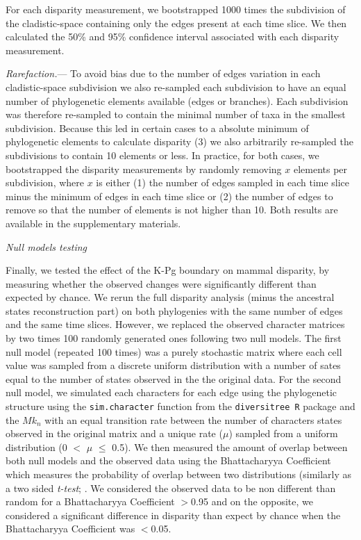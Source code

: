 \documentclass[12pt,letterpaper]{article}
\renewcommand{\subsection}[1]{%
\bigskip
\begin{center}
\begin{large}
\normalfont\itshape #1
\end{large}
\end{center}}
\renewcommand{\subsubsection}[1]{%
\vspace{2ex}
\noindent
\textit{#1.}---}
\begin{document}
For each disparity measurement, we bootstrapped 1000 times the subdivision of the cladistic-space containing only the edges present at each time slice. We then calculated the 50\% and 95\% confidence interval associated with each disparity measurement.

\subsubsection{Rarefaction}
To avoid bias due to the number of edges variation in each cladistic-space subdivision we also re-sampled each subdivision to have an equal number of phylogenetic elements available (edges or branches). Each subdivision was therefore re-sampled to contain the minimal number of taxa in the smallest subdivision. Because this led in certain cases to a absolute minimum of phylogenetic elements to calculate disparity (3) we also arbitrarily re-sampled the subdivisions to contain 10 elements or less. In practice, for both cases, we bootstrapped the disparity measurements by randomly removing $x$ elements per subdivision, where $x$ is either (1) the number of edges sampled in each time slice minus the minimum of edges in each time slice or (2) the number of edges to remove so that the number of elements is not higher than 10. Both results are available in the supplementary materials.

\subsection{Null models testing}
Finally, we tested the effect of the K-Pg boundary on mammal disparity, by measuring whether the observed changes were significantly different than expected by chance. We rerun the full disparity analysis (minus the ancestral states reconstruction part) on both phylogenies with the same number of edges and the same time slices. However, we replaced the observed character matrices by two times 100 randomly generated ones following two null models. The first null model (repeated 100 times) was a purely stochastic matrix where each cell value was sampled from a discrete uniform distribution with a number of sates equal to the number of states observed in the the original data. For the second null model, we simulated each characters for each edge using the phylogenetic structure using the \texttt{sim.character} function from the \texttt{diversitree R} package \citep{fitzjohndiversitree2012} and the $Mk_n$ \citep{lewisa2001} with an equal transition rate between the number of characters states observed in the original matrix and a unique rate ($\mu$) sampled from a uniform distribution (0 $<$ $\mu$ $\leq$ 0.5). 
We then measured the amount of overlap between both null models and the observed data using the Bhattacharyya Coefficient \citep{Bhattacharyya} which measures the probability of overlap between two distributions (similarly as a two sided \textit{t-test}; \citealt{GuillermeCooper}. We considered the observed data to be non different than random for a Bhattacharyya Coefficient $>$0.95 and on the opposite, we considered a significant difference in disparity than expect by chance when the Bhattacharyya Coefficient was $<$0.05.
\end{document}
